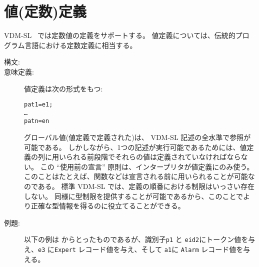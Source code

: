 \documentclass[\pformat,12pt]{jarticle}
\newcommand{\vdmslpp}[2]{%
#1
}
\newcommand{\vdmsl}{VDM-SL}
\newcommand{\vdmpp}{VDM++}
\begin{document}
\section{値(定数)定義} \label{valuedef}

\vdmslpp{\vdmsl}{\vdmpp}\ では定数値の定義をサポートする。 
値定義については、伝統的プログラム言語における定数定義に相当する。

\begin{description}
\item[構文:]




\item[意味定義:] 値定義は次の形式をもつ:
  \begin{alltt}
       pat1 = e1;
      \ldots
       patn = en
  \end{alltt}

  
グローバル値(値定義で定義された)は、 \vdmslpp{\vdmsl}{\vdmpp} 記述の全水準で参照が可能である。
しかしながら、1つの記述が実行可能であるためには、値定義の列に用いられる前段階でそれらの値は定義されていなければならない。 
この ``使用前の宣言'' 原則は、インタープリタが値定義にのみ使う。
 このことはたとえば、関数などは宣言される前に用いられることが可能なのである。
標準 VDM-SL では、定義の順番における制限はいっさい存在しない。
同様に型制限を提供することが可能であるから、このことでより正確な型情報を得るのに役立てることができる。


\item[例題:] 以下の例は \cite{Fitzgerald&98} からとったものであるが、識別子\texttt{p1} と \texttt{eid2}にトークン値を与え、\texttt{e3} に\texttt{Expert} レコード値を与え、そして \texttt{a1}に \texttt{Alarm} レコード値を与える。
\begin{alltt}


\end{alltt}
\end{description}
\end{document}
